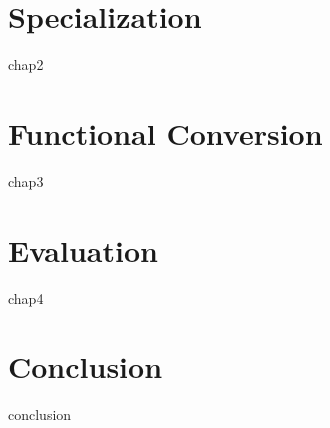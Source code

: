 \documentclass[11pt,a4paper]{book}
\begin{document}
\chapter{Specialization}\label{chap:2}
{chap2}  

\chapter{Functional Conversion}\label{chap:3}
{chap3}

\chapter{Evaluation}\label{chap:4}
{chap4}


\chapter{Conclusion}\label{chap:conclusion}
{conclusion}

\backmatter




\cleardoublepage
{}
{}


 

\end{document}
